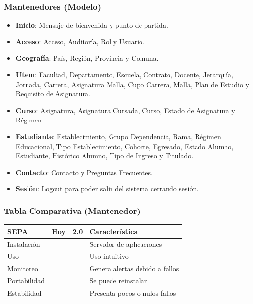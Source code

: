 \documentclass{beamer}
\newcommand{\cmark}{\ding{51}}%
\newcommand{\xmark}{\ding{55}}%
\begin{document}

\begin{frame}
\frametitle{Mantenedores (Modelo)}
\begin{itemize}
\item \textbf{Inicio}: Mensaje de bienvenida y punto de partida.
\item \textbf{Acceso}: Acceso, Auditoría, Rol y Usuario.
\item \textbf{Geografía}: País, Región, Provincia y Comuna.
\item \textbf{Utem}: Facultad, Departamento, Escuela, Contrato, Docente, Jerarquía, Jornada, Carrera, Asignatura Malla, Cupo Carrera, Malla, Plan de Estudio y Requisito de Asignatura.
\item \textbf{Curso}: Asignatura, Asignatura Cursada, Curso, Estado de Asignatura y Régimen.
\item \textbf{Estudiante}: Establecimiento, Grupo Dependencia, Rama, Régimen Educacional, Tipo Establecimiento, Cohorte, Egresado, Estado Alumno, Estudiante, Histórico Alumno, Tipo de Ingreso y Titulado.
\item \textbf{Contacto}: Contacto y Preguntas Frecuentes.
\item \textbf{Sesión}: Logout para poder salir del sistema cerrando sesión.
\end{itemize}
\end{frame}


\begin{frame}
\frametitle{Tabla Comparativa (Mantenedor)}
\begin{table}
\begin{tabular}{l l l l}
\toprule
\textbf{SEPA} & \textbf{Hoy} & \textbf{2.0} & Característica\\
\midrule
Instalación 	& \textcolor{green}{\cmark} & \textcolor{green}{\cmark} & Servidor de aplicaciones  \\
Uso		 		& \textcolor{green}{\cmark} & \textcolor{green}{\cmark} & Uso intuitivo \\
Monitoreo 		& \textcolor{green}{\cmark} & \textcolor{green}{\cmark} & Genera alertas debido a fallos \\
Portabilidad 	& \textcolor{red}{\xmark}   & \textcolor{green}{\cmark} & Se puede reinstalar \\
Estabilidad 	& \textcolor{red}{\xmark}   & \textcolor{green}{\cmark} & Presenta pocos o nulos fallos \\
\bottomrule
\end{tabular}
\end{table}
\end{frame}
\end{document}
